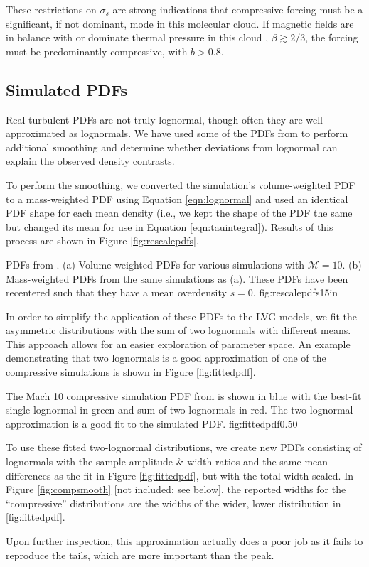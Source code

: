 These restrictions on $\sigma_s$ are strong indications that compressive
forcing must be a significant, if not dominant, mode in this molecular cloud.
If magnetic fields are in balance with or dominate thermal pressure in this
cloud , $\beta\gtrsim2/3$, the forcing must be predominantly
compressive, with $b>0.8$.

\subsection{Simulated PDFs}
\label{sec:simpdfs}
Real turbulent PDFs are not truly lognormal, though often they are
well-approximated as lognormals.  We have used some of the PDFs from
\citet{Federrath2012a} to perform additional smoothing and determine
whether deviations from lognormal can explain the observed density contrasts.

To perform the smoothing, we converted the simulation's volume-weighted PDF to
a mass-weighted PDF using Equation \ref{eqn:lognormal} and used an identical
PDF shape for each mean density (i.e., we kept the shape of the PDF the same
but changed its mean for use in Equation \ref{eqn:tauintegral}).  Results of this process
are shown in Figure \ref{fig:rescalepdfs}.

{PDFs from \citet{Federrath2012a}.  (a) Volume-weighted PDFs for various
simulations with $\mathcal{M}=10$.  (b) Mass-weighted PDFs from the same
simulations as (a).  These PDFs have been recentered such that they
have a mean overdensity $s=0$.
}{fig:rescalepdfs}{1}{5in}

In order to simplify the application of these PDFs to the LVG models, we fit
the asymmetric distributions with the sum of two lognormals with different
means.  This approach allows for an easier exploration of parameter space.
An example demonstrating that two lognormals is a good approximation of one of the
compressive simulations is shown in Figure \ref{fig:fittedpdf}.

{The Mach 10 compressive simulation PDF from \citet{Federrath2012a} is shown in
blue with the best-fit single lognormal in green and sum of two lognormals in
red.  The two-lognormal approximation is a good fit to the simulated PDF.}
{fig:fittedpdf}{0.5}{0}

To use these fitted two-lognormal distributions, we create new PDFs consisting
of lognormals with the sample amplitude \& width ratios and the same mean
differences as the fit in Figure \ref{fig:fittedpdf}, but with the total width
scaled.  In Figure \ref{fig:compsmooth} [not included; see below], the reported widths for the
``compressive'' distributions are the widths of the wider, lower distribution
in \ref{fig:fittedpdf}.

Upon further inspection, this approximation actually does a poor job as it
fails to reproduce the tails, which are more important than the peak.



